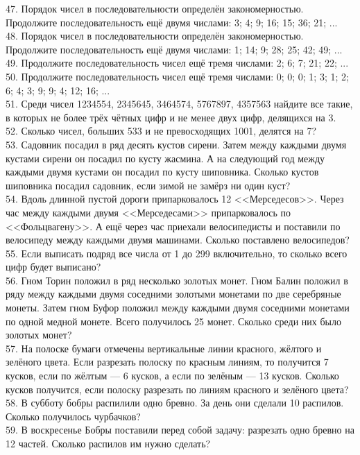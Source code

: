 \documentclass[12pt]{article}
\begin{document}
47. Порядок чисел в последовательности определён закономерностью. Продолжите последовательность ещё двумя числами: 3; 4; 9; 16; 15; 36; 21; ...\\
48. Порядок чисел в последовательности определён закономерностью. Продолжите последовательность ещё двумя числами: 1; 14; 9; 28; 25; 42; 49; ...\\
49. Продолжите последовательность чисел ещё тремя числами: 2; 6; 7; 21; 22; ...\\
50. Продолжите последовательность чисел ещё тремя числами: 0; 0; 0; 1; 3; 1; 2; 6; 4; 3; 9; 9; 4; 12; 16; ...\\
51. Среди чисел 1234554, 2345645, 3464574, 5767897, 4357563 найдите все такие, в которых не более трёх чётных цифр и не менее двух цифр, делящихся на 3.\\
52. Сколько чисел, больших 533 и не превосходящих 1001, делятся на 7?\\
53. Садовник посадил в ряд десять кустов сирени. Затем между каждыми двумя кустами сирени он посадил по кусту жасмина. А на следующий год между каждыми двумя кустами он посадил по кусту шиповника. Сколько кустов шиповника посадил садовник, если зимой не замёрз ни один куст?\\
54. Вдоль длинной пустой дороги припарковалось 12 <<Мерседесов>>. Через час между каждыми двумя <<Мерседесами>> припарковалось по <<Фольцвагену>>. А ещё через час приехали велосипедисты и поставили по велосипеду между каждыми двумя машинами. Сколько поставлено велосипедов?\\
55. Если выписать подряд все числа от 1 до 299 включительно, то сколько всего цифр будет выписано?\\
56. Гном Торин положил в ряд несколько золотых монет. Гном Балин положил в ряду между каждыми двумя соседними золотыми монетами по две серебряные монеты. Затем гном Буфор положил между каждыми двумя соседними монетами по одной медной монете. Всего получилось 25 монет. Сколько среди них было золотых монет?\\
57. На полоске бумаги отмечены вертикальные линии красного, жёлтого и зелёного цвета. Если разрезать полоску по красным линиям, то получится 7 кусков, если по жёлтым --- 6 кусков, а если по зелёным --- 13 кусков. Сколько кусков получится, если полоску разрезать по линиям красного и зелёного цвета?\\
58. В субботу бобры распилили одно бревно. За день они сделали 10 распилов. Сколько получилось чурбачков?\\
59. В воскресенье Бобры поставили перед собой задачу: разрезать одно бревно на 12 частей. Сколько распилов им нужно сделать?\\
\end{document}

